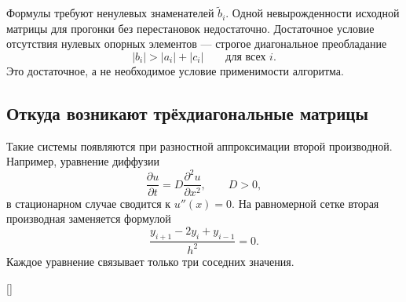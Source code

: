 \documentclass[../final.tex]{subfiles}
\begin{document}
\remark
Формулы требуют ненулевых знаменателей $\widetilde b_i$.
Одной невырожденности исходной матрицы для прогонки без перестановок
недостаточно. Достаточное условие отсутствия нулевых опорных элементов ---
строгое диагональное преобладание
\begin{equation*}
    |b_i|>|a_i|+|c_i|\qquad\text{для всех }i.
\end{equation*}
Это достаточное, а не необходимое условие применимости алгоритма.

\subsection{Откуда возникают трёхдиагональные матрицы}

Такие системы появляются при разностной аппроксимации второй
производной. Например, уравнение диффузии
\begin{equation*}
    \frac{\partial u}{\partial t}
    =D\frac{\partial^2u}{\partial x^2},\qquad D>0,
\end{equation*}
в стационарном случае сводится к $u''(x)=0$.
На равномерной сетке вторая производная заменяется формулой
\begin{equation*}
    \frac{y_{i+1}-2y_i+y_{i-1}}{h^2}=0.
\end{equation*}
Каждое уравнение связывает только три соседних значения.

\begin{rbox}[breakable=false,left=18pt,right=18pt,top=14pt,bottom=10pt]{[]}
    \centering
    \label{fig:ovf7_three_point_stencil}
\end{rbox}
\end{document}
